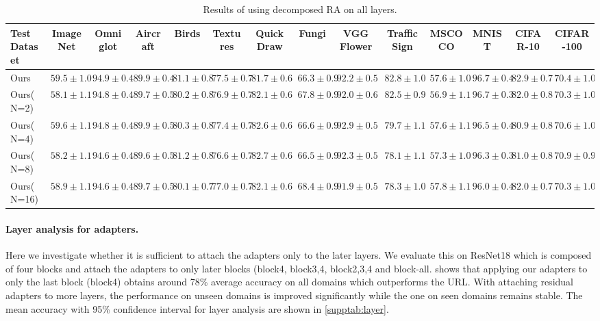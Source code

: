 \begin{table*}[h!]
	\centering
    \resizebox{1.0\textwidth}{!}
    {
		\begin{tabular}{lcccccccc|ccccc}

		    \toprule
		    Test Dataset & ImageNet & Omniglot & Aircraft & Birds & Textures & Quick Draw & Fungi & VGG Flower & Traffic Sign & MSCOCO & MNIST & CIFAR-10 & CIFAR-100\\
		    \midrule
		    Ours & $59.5 \pm 1.0$ & $94.9 \pm 0.4$ & $89.9 \pm 0.4$ & $81.1 \pm 0.8$ & $77.5 \pm 0.7$ & $81.7 \pm 0.6$ & $66.3 \pm 0.9$ & $92.2 \pm 0.5$ & $82.8 \pm 1.0$ & $57.6 \pm 1.0$ & $96.7 \pm 0.4$ & $82.9 \pm 0.7$ & $70.4 \pm 1.0$ \\
		    Ours(N=2) & $58.1 \pm 1.1$ & $94.8 \pm 0.4$ & $89.7 \pm 0.5$ & $80.2 \pm 0.8$ & $76.9 \pm 0.7$ & $82.1 \pm 0.6$ & $67.8 \pm 0.9$ & $92.0 \pm 0.6$ & $82.5 \pm 0.9$ & $56.9 \pm 1.1$ & $96.7 \pm 0.3$ & $82.0 \pm 0.8$ & $70.3 \pm 1.0$ \\
		    Ours(N=4) & $59.6 \pm 1.1$ & $94.8 \pm 0.4$ & $89.9 \pm 0.5$ & $80.3 \pm 0.8$ & $77.4 \pm 0.7$ & $82.6 \pm 0.6$ & $66.6 \pm 0.9$ & $92.9 \pm 0.5$ & $79.7 \pm 1.1$ & $57.6 \pm 1.1$ & $96.5 \pm 0.4$ & $80.9 \pm 0.8$ & $70.6 \pm 1.0$ \\
		    Ours(N=8) & $58.2 \pm 1.1$ & $94.6 \pm 0.4$ & $89.6 \pm 0.5$ & $81.2 \pm 0.8$ & $76.6 \pm 0.7$ & $82.7 \pm 0.6$ & $66.5 \pm 0.9$ & $92.3 \pm 0.5$ & $78.1 \pm 1.1$ & $57.3 \pm 1.0$ & $96.3 \pm 0.3$ & $81.0 \pm 0.8$ & $70.9 \pm 0.9$ \\
		    Ours(N=16) & $58.9 \pm 1.1$ & $94.6 \pm 0.4$ & $89.7 \pm 0.5$ & $80.1 \pm 0.7$ & $77.0 \pm 0.7$ & $82.1 \pm 0.6$ & $68.4 \pm 0.9$ & $91.9 \pm 0.5$ & $78.3 \pm 1.0$ & $57.8 \pm 1.1$ & $96.0 \pm 0.4$ & $82.0 \pm 0.7$ & $70.3 \pm 1.0$ \\
			\bottomrule
		\end{tabular}%
			}
		\vspace{-0.15cm}
		\caption{Results of using decomposed RA on all layers.}
		\label{supptab:decom}
\end{table*}%





\paragraph{Layer analysis for adapters.}
Here we investigate whether it is sufficient to attach the adapters only to the later layers.
We evaluate this on ResNet18 which is composed of four blocks and attach the adapters to only later blocks (block4, block3,4, block2,3,4 and block-all. 
 shows that applying our adapters to only the last block (block4) obtains around 78\% average accuracy on all domains which outperforms the URL. With attaching residual adapters to more layers, the performance on unseen domains is improved significantly while the one on seen domains remains stable.
The mean accuracy with 95\% confidence interval for layer analysis are shown in \cref{supptab:layer}.



